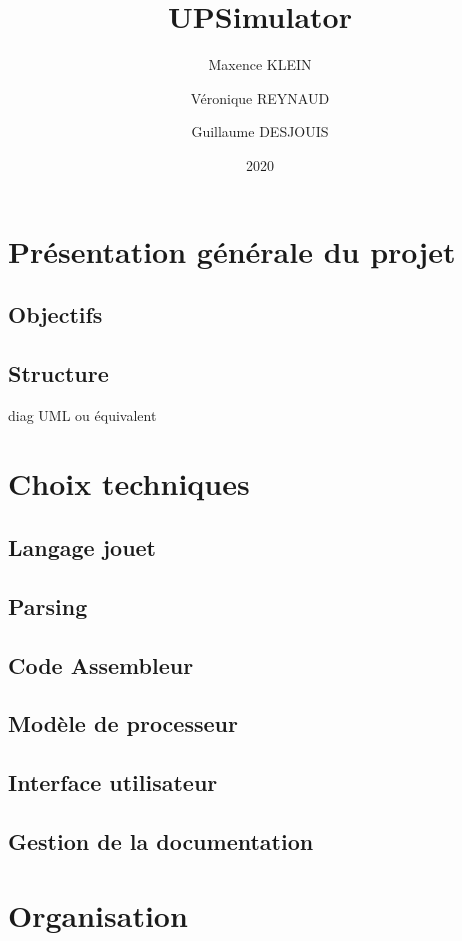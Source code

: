 \documentclass[10pt]{scrreprt} %
\title{UPSimulator}
\author{Maxence KLEIN\\ \and Véronique REYNAUD\\ \and Guillaume DESJOUIS }
\date{2020}
\begin{document}
\maketitle
\tableofcontents
\clearpage

\section{Présentation générale du projet}
\subsection{Objectifs}

\subsection{Structure}
diag UML ou équivalent

\clearpage
\section{Choix techniques}
\subsection{Langage jouet}



\clearpage

\subsection{Parsing}




\subsection{Code Assembleur}
\subsection{Modèle de processeur}
\subsection{Interface utilisateur}
\subsection{Gestion de la documentation}
\section{Organisation}
\end{document}

